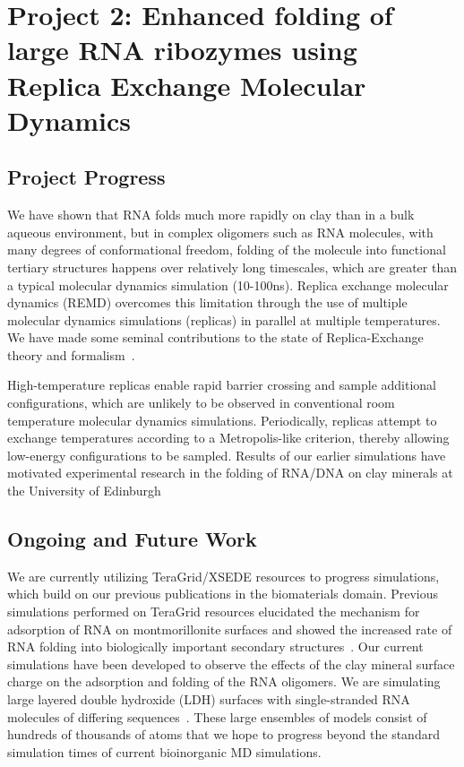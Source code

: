 \documentclass[a4paper,11pt]{article}
\begin{document}
\section{Project 2: Enhanced folding of large RNA ribozymes using Replica Exchange Molecular Dynamics}

\subsection{Project Progress}

We have shown that RNA folds much more rapidly on clay than in a bulk aqueous environment, but in complex oligomers such as RNA molecules, with many degrees of conformational freedom, folding of the molecule into functional tertiary structures happens over relatively long timescales, which are greater than a typical molecular dynamics simulation (10-100ns). Replica exchange molecular dynamics (REMD) overcomes this limitation through the use of multiple molecular dynamics simulations (replicas) in parallel at multiple temperatures.  We have made some seminal contributions to the state of Replica-Exchange theory and formalism~\cite{async_repex11, Luckow:2008la,luckow2009adaptive}.

High-temperature replicas enable rapid barrier crossing and sample additional configurations, which are unlikely to be observed in conventional room temperature molecular dynamics simulations. Periodically, replicas attempt to exchange temperatures according to a Metropolis-like criterion, thereby allowing low-energy configurations to be sampled. Results of our earlier simulations have motivated experimental research in the folding of RNA/DNA on clay minerals at the University of Edinburgh

\subsection{Ongoing and Future Work}
We are currently utilizing TeraGrid/XSEDE resources to progress simulations, which build on our previous publications in the biomaterials domain. Previous simulations performed on TeraGrid resources elucidated the mechanism for adsorption of RNA on montmorillonite surfaces and showed the increased rate of RNA folding into biologically important secondary structures~\cite{Ref9}. Our current simulations have been developed to observe the effects of the clay mineral surface charge on the adsorption and folding of the RNA oligomers. We are simulating large layered double hydroxide (LDH) surfaces with single-stranded RNA molecules of differing sequences~\cite{Ref10}. These large ensembles of models consist of hundreds of thousands of atoms that we hope to progress beyond the standard simulation times of current bioinorganic MD simulations.
\end{document}
